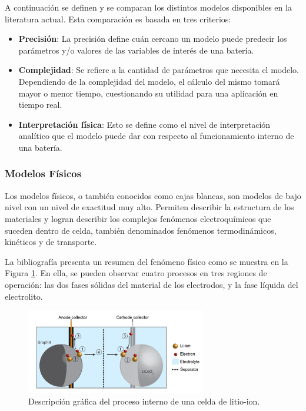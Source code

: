 \documentclass[10pt,a4paper]{article}
\begin{document}
\noindent A continuaci\'on se definen y se comparan los distintos modelos 
disponibles en la literatura actual. Esta comparaci\'on es basada en tres 
criterios:

\begin{itemize}
    \item \textbf{Precisi\'on}: La precisi\'on define cu\'an cercano un modelo
        puede predecir los par\'ametros y/o valores de las variables de
        inter\'es de una bater\'ia.
    \item \textbf{Complejidad}: Se refiere a la cantidad de par\'ametros que
        necesita el modelo. Dependiendo de la complejidad del modelo, el 
        c\'alculo del mismo tomar\'a mayor o menor tiempo, cuestionando su 
        utilidad para una aplicaci\'on en tiempo real.
    \item \textbf{Interpretaci\'on f\'isica}: Esto se define como el nivel de
        interpretaci\'on anal\'itico que el modelo puede dar con respecto al
        funcionamiento interno de una bater\'ia.
\end{itemize}

\subsubsection{Modelos F\'isicos}\label{phyModel}

\noindent Los modelos f\'isicos, o tambi\'en conocidos como cajas blancas, son 
modelos de bajo nivel con un nivel de exactitud muy alto. Permiten describir la 
estructura de los materiales y logran describir los complejos fen\'omenos 
electroqu\'imicos que suceden dentro de celda, tambi\'en denominados fen\'omenos 
termodin\'amicos, kin\'eticos y de transporte.

\noindent La bibliograf\'ia \cite{Schmidt2013} presenta un resumen del 
fen\'omeno f\'isico como se muestra en la Figura \ref{schmidt_fen_fis}. En ella, 
se pueden observar cuatro procesos en tres regiones de operaci\'on: las dos 
fases s\'olidas del material de los electrodos, y la fase l\'iquida del 
electrolito.

\begin{figure}[h!]
    \begin{center}
        \includegraphics[width=0.7\textwidth]{schmidt_proceso_fisico.png}
        \caption{Descripci\'on gr\'afica del proceso interno de una celda de
        litio-ion.}
        \label{schmidt_fen_fis}
    \end{center}
\end{figure}
\end{document}
